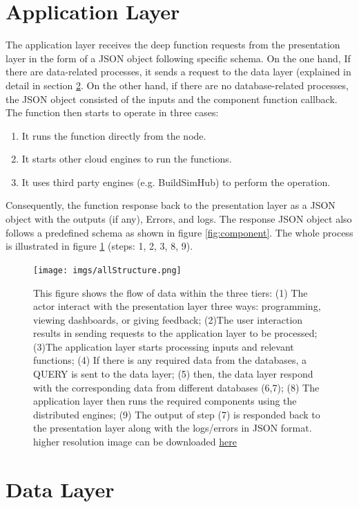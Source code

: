 \documentclass{scsSimAUDPaperFormat}
\begin{document}
\section{Application Layer}
The application layer receives the deep function requests from the presentation layer in the form of a JSON object following specific schema. On the one hand, If there are data-related processes, it sends a request to the data layer (explained in detail in section \ref{sec:datalayer}. On the other hand, if there are no database-related processes, the JSON object consisted of the inputs and the component function callback. The function then starts to operate in three cases:
\begin{enumerate}
    \item It runs the function directly from the node. 
    \item It starts other cloud engines to run the functions. 
    \item It uses third party engines (e.g. BuildSimHub) to perform the operation. 
\end{enumerate}
Consequently, the function response back to the presentation layer as a JSON object with the outputs (if any), Errors, and logs. The response JSON object also follows a predefined schema as shown in figure \ref{fig:component}. The whole process is illustrated in figure \ref{fig:structure} (steps: 1, 2, 3, 8, 9).
\begin{figure}[ht]
\centering
\texttt{[image: imgs/allStructure.png]}
\caption{This figure shows the flow of data within the three tiers: (1) The actor interact with the presentation layer three ways: programming, viewing dashboards, or giving feedback; (2)The user interaction results in sending requests to the application layer to be processed; (3)The application layer starts processing inputs and relevant functions; (4) If there is any required data from the databases, a QUERY is sent to the data layer; (5) then, the data layer respond with the corresponding data from different databases (6,7); (8) The application layer then runs the required components using the distributed engines; (9) The output of step (7) is responded back to the presentation layer along with the logs/errors in JSON format. higher resolution image can be downloaded \href{https://user-images.githubusercontent.com/6969514/72152397-cee71700-33e5-11ea-9108-c6823d2be504.png}{here}
}
\label{fig:structure}
\end{figure}

\section{Data Layer}\label{sec:datalayer}
\end{document}
